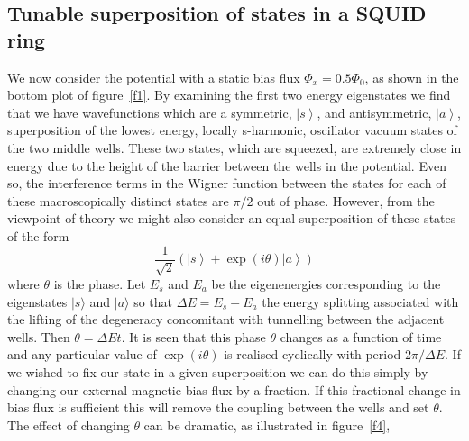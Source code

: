 \documentclass[twocolumn,a4paper,superscriptaddress,showpacs,floatfix,pra]{revtex4}
\begin{document}
\subsection*{Tunable superposition of states in a SQUID ring}

We  now  consider  the  potential   with  a  static  bias  flux  $\Phi
_{x}=0.5\Phi   _{0}   $,   as    shown   in   the   bottom   plot   of
figure~\ref{f1}. By examining the first two energy eigenstates we find
that  we  have  wavefunctions   which  are  a  symmetric,  $\left\vert
s\right\rangle  $, and  antisymmetric,  $\left\vert a\right\rangle  $,
superposition  of the  lowest energy,  locally  s-harmonic, oscillator
vacuum states  of the  two middle wells.  These two states,  which are
squeezed,  are extremely  close in  energy due  to the  height  of the
barrier between the wells in  the potential. Even so, the interference
terms  in the Wigner  function between  the states  for each  of these
macroscopically distinct  states are $\pi  /2$ out of  phase. However,
from  the  viewpoint  of  theory  we  might  also  consider  an  equal
superposition of these states of the form
\begin{equation}
\frac{1}{\sqrt{2}}\left( \left\vert s\right\rangle +\exp (i\theta
)\left\vert a\right\rangle \right)  \label{phaseequ}
\end{equation}
where $\theta $ is the phase. Let $E_{s}$ and $E_{a}$ be the
eigenenergies  corresponding  to  the  eigenstates $|s\rangle  $  and
$|a\rangle  $ so  that  $\Delta E=E_{s}-E_{a}$  the energy  splitting
associated  with  the  lifting  of  the  degeneracy  concomitant  with
tunnelling between the adjacent wells. Then $\theta =\Delta Et$. It is
seen that this phase $\theta $  changes as a function of time and any
particular  value of $\exp  (i\theta )$  is realised  cyclically with
period $2\pi  /\Delta E$.  If we wished  to fix  our state in  a given
superposition we can do this  simply by changing our external magnetic
bias flux  by a fraction.  If this fractional  change in bias  flux is
sufficient this  will remove  the coupling between  the wells  and set
$\theta  $. The  effect  of changing  $\theta  $ can  be dramatic,  as
illustrated in figure~\ref{f4},
\end{document}
